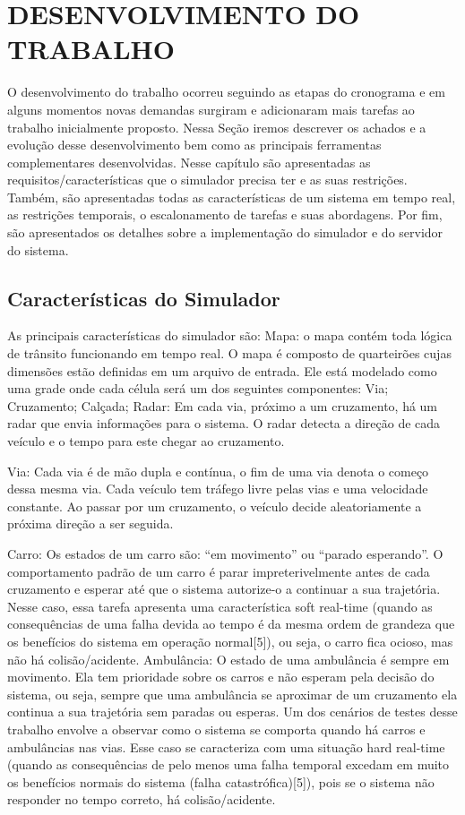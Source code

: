 \chapter{DESENVOLVIMENTO DO TRABALHO}

O desenvolvimento do trabalho ocorreu seguindo as etapas do cronograma e em alguns momentos novas demandas surgiram e adicionaram mais tarefas ao trabalho inicialmente proposto. Nessa Seção iremos descrever os achados e a evolução desse desenvolvimento bem como as principais ferramentas complementares desenvolvidas.
Nesse capítulo são apresentadas as requisitos/características que o simulador precisa ter e as suas restrições. Também, são apresentadas todas as características de um sistema em tempo real, as restrições temporais, o escalonamento de tarefas e suas abordagens. Por fim, são apresentados os detalhes sobre a implementação do simulador e do servidor do sistema.


\section{Características do Simulador}

As principais características do simulador são:
Mapa: o mapa contém toda lógica de trânsito funcionando em tempo real. O mapa é  composto de quarteirões cujas dimensões estão definidas em um arquivo de entrada. Ele está modelado como uma grade onde cada célula será um dos seguintes componentes:
Via;
Cruzamento;
Calçada;
Radar: Em cada via, próximo a um cruzamento, há um radar que envia informações para o sistema. O radar detecta a direção de cada veículo e o tempo para este chegar ao cruzamento.

Via: Cada via é de mão dupla e contínua, o fim de uma via denota o começo dessa mesma via. Cada veículo tem tráfego livre pelas vias e uma velocidade constante.  Ao passar por um cruzamento, o veículo decide aleatoriamente a próxima direção a ser seguida.

Carro: Os estados de um carro são: “em movimento” ou “parado esperando”. O comportamento padrão de um carro é parar impreterivelmente antes de cada cruzamento e esperar até que o sistema autorize-o a continuar a sua trajetória. Nesse caso, essa tarefa apresenta uma característica soft real-time (quando as consequências de uma falha devida ao tempo é da mesma ordem de grandeza que os benefícios do sistema em operação normal[5]), ou seja, o carro fica ocioso, mas não há colisão/acidente.
Ambulância: O estado de uma ambulância é sempre em movimento. Ela tem prioridade sobre os carros e não esperam pela decisão do sistema, ou seja, sempre que uma ambulância se aproximar de um cruzamento ela continua a sua trajetória sem paradas ou esperas. Um dos cenários de testes desse trabalho envolve a observar como o sistema se comporta quando há carros e ambulâncias nas vias. Esse caso se caracteriza com uma situação hard real-time (quando as consequências de pelo menos uma falha temporal excedam em muito os benefícios normais do sistema (falha catastrófica)[5]), pois se o sistema não responder no tempo correto, há colisão/acidente.

